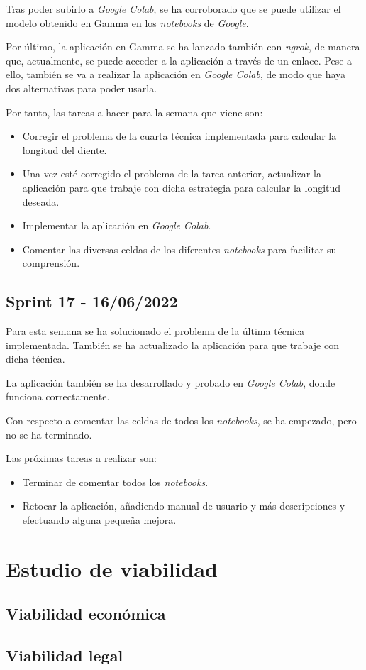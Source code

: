 Tras poder subirlo a \emph{Google Colab}, se ha corroborado que se puede utilizar el modelo obtenido en Gamma en los \emph{notebooks} de \emph{Google}.

Por último, la aplicación en Gamma se ha lanzado también con \emph{ngrok}, de manera que, actualmente, se puede acceder a la aplicación a través de un enlace. Pese a ello, también se va a realizar la aplicación en \emph{Google Colab}, de modo que haya dos alternativas para poder usarla.

Por tanto, las tareas a hacer para la semana que viene son:
\begin{itemize}
    \item Corregir el problema de la cuarta técnica implementada para calcular la longitud del diente.
    \item Una vez esté corregido el problema de la tarea anterior, actualizar la aplicación para que trabaje con dicha estrategia para calcular la longitud deseada.
    \item Implementar la aplicación en \emph{Google Colab}.
    \item Comentar las diversas celdas de los diferentes \emph{notebooks} para facilitar su comprensión. 
\end{itemize}
\subsection{Sprint 17 - 16/06/2022}
Para esta semana se ha solucionado el problema de la última técnica implementada. También se ha actualizado la aplicación para que trabaje con dicha técnica.

La aplicación también se ha desarrollado y probado en \emph{Google Colab}, donde funciona correctamente.

Con respecto a comentar las celdas de todos los \emph{notebooks}, se ha empezado, pero no se ha terminado.

Las próximas tareas a realizar son:
\begin{itemize}
    \item Terminar de comentar todos los \emph{notebooks}.
    \item Retocar la aplicación, añadiendo manual de usuario y más descripciones y efectuando alguna pequeña mejora.
\end{itemize}
\section{Estudio de viabilidad}

\subsection{Viabilidad económica}

\subsection{Viabilidad legal}


